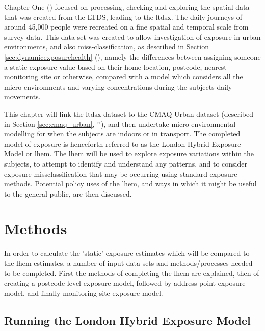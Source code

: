 Chapter One () focused on processing, checking and exploring the spatial data that was created from the LTDS, leading to the \gls{ltdsx}. The daily journeys of around 45,000 people were recreated on a fine spatial and temporal scale from survey data. This data-set was created to allow investigation of exposure in urban environments, and also miss-classification, as described in Section \ref{sec:dynamicexposurehealth} (), namely the differences between assigning someone a static exposure value based on their home location, postcode, nearest monitoring site or otherwise, compared with a model which considers all the micro-environments and varying concentrations during the subjects daily movements.

This chapter will link the \gls{ltdsx} dataset to the CMAQ-Urban dataset (described in Section \ref{sec:cmaq_urban}, ''), and then undertake micro-environmental modelling for when the subjects are indoors or in transport. The completed model of exposure is henceforth referred to as the London Hybrid Exposure Model or \gls{lhem}. The \gls{lhem} will be used to explore exposure variations within the subjects, to attempt to identify and understand any patterns, and to consider exposure missclassification that may be occurring using standard exposure methods. Potential policy uses of the \gls{lhem}, and ways in which it might be useful to the general public, are then discussed.

\section{Methods}
\label{sec:2methods}

In order to calculate the 'static' exposure estimates which will be compared to the \gls{lhem} estimates, a number of input data-sets and methods/processes needed to be completed. First the methods of completing the \gls{lhem} are explained, then of creating a postcode-level exposure model, followed by address-point exposure model, and finally monitoring-site exposure model.

    \subsection{Running the London Hybrid Exposure Model}
    \label{sec:running_the_lhem}

